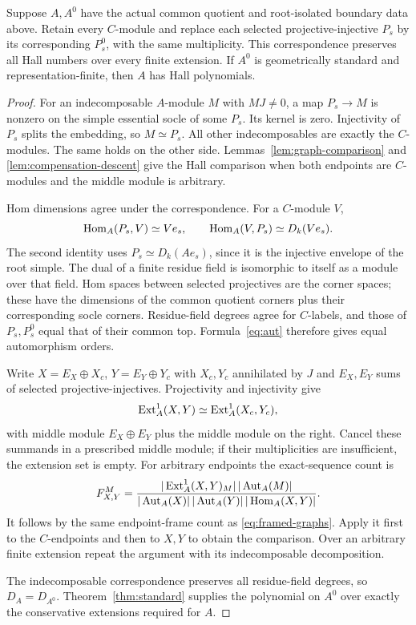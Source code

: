 \begin{proposition}\label{prop:isolated-comparison}
Suppose $A,A^0$ have the actual common quotient and root-isolated boundary data above. Retain every $C$-module and replace each selected projective-injective $P_s$ by its corresponding $P_s^0$, with the same multiplicity. This correspondence preserves all Hall numbers over every finite extension. If $A^0$ is geometrically standard and representation-finite, then $A$ has Hall polynomials.
\end{proposition}
\begin{proof}
For an indecomposable $A$-module $M$ with $MJ\ne0$, a map $P_s\to M$ is nonzero on the simple essential socle of some $P_s$. Its kernel is zero. Injectivity of $P_s$ splits the embedding, so $M\simeq P_s$. All other indecomposables are exactly the $C$-modules. The same holds on the other side. Lemmas~\ref{lem:graph-comparison} and \ref{lem:compensation-descent} give the Hall comparison when both endpoints are $C$-modules and the middle module is arbitrary.

Hom dimensions agree under the correspondence. For a $C$-module $V$,
\[
 \operatorname{Hom}_A(P_s,V)\simeq Ve_s,\qquad
 \operatorname{Hom}_A(V,P_s)\simeq D_k(Ve_s).
\]
The second identity uses $P_s\simeq D_k(Ae_s)$, since it is the injective envelope of the root simple. The dual of a finite residue field is isomorphic to itself as a module over that field. Hom spaces between selected projectives are the corner spaces; these have the dimensions of the common quotient corners plus their corresponding socle corners. Residue-field degrees agree for $C$-labels, and those of $P_s,P_s^0$ equal that of their common top. Formula~\eqref{eq:aut} therefore gives equal automorphism orders.

Write $X=E_X\oplus X_c$, $Y=E_Y\oplus Y_c$ with $X_c,Y_c$ annihilated by $J$ and $E_X,E_Y$ sums of selected projective-injectives. Projectivity and injectivity give
\[
 \operatorname{Ext}_A^1(X,Y)\simeq\operatorname{Ext}_A^1(X_c,Y_c),
\]
with middle module $E_X\oplus E_Y$ plus the middle module on the right. Cancel these summands in a prescribed middle module; if their multiplicities are insufficient, the extension set is empty. For arbitrary endpoints the exact-sequence count is
\begin{equation}\label{eq:extension-hall}
 F^M_{X,Y}=
 \frac{|\operatorname{Ext}_A^1(X,Y)_M|\,|\operatorname{Aut}_A(M)|}
 {|\operatorname{Aut}_A(X)|\,|\operatorname{Aut}_A(Y)|\,|\operatorname{Hom}_A(X,Y)|}.
\end{equation}
It follows by the same endpoint-frame count as \eqref{eq:framed-graphs}. Apply it first to the $C$-endpoints and then to $X,Y$ to obtain the comparison. Over an arbitrary finite extension repeat the argument with its indecomposable decomposition.

The indecomposable correspondence preserves all residue-field degrees, so $D_A=D_{A^0}$. Theorem~\ref{thm:standard} supplies the polynomial on $A^0$ over exactly the conservative extensions required for $A$.
\end{proof}
